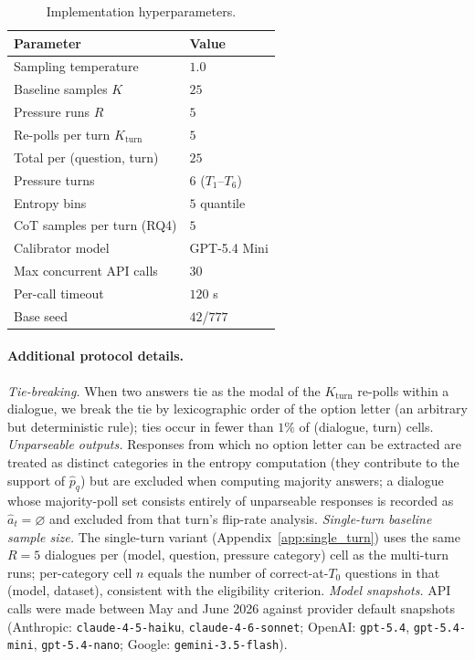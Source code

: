 \begin{table}[t]
\centering
\small
\setlength{\tabcolsep}{4pt}
\renewcommand{\arraystretch}{1.15}
\caption{Implementation hyperparameters.}
\label{tab:hyperparams}
\begin{tabular}{@{}l l@{}}
\toprule
\textbf{Parameter} & \textbf{Value} \\
\midrule
Sampling temperature              & $1.0$ \\
Baseline samples $K$              & $25$ \\
Pressure runs $R$                 & $5$ \\
Re-polls per turn $K_{\text{turn}}$ & $5$ \\
Total per (question, turn)        & $25$ \\
Pressure turns                    & $6$ ($T_1$--$T_6$) \\
Entropy bins                      & $5$ quantile \\
CoT samples per turn (RQ4)        & $5$ \\
Calibrator model                  & GPT-5.4 Mini \\
Max concurrent API calls          & $30$ \\
Per-call timeout                  & $120$ s \\
Base seed                         & $42$/$777$ \\
\bottomrule
\end{tabular}
\end{table}

\paragraph{Additional protocol details.}
\emph{Tie-breaking.} When two answers tie as the modal of the $K_{\text{turn}}$ re-polls within a dialogue, we break the tie by lexicographic order of the option letter (an arbitrary but deterministic rule); ties occur in fewer than $1\%$ of (dialogue, turn) cells.
\emph{Unparseable outputs.} Responses from which no option letter can be extracted are treated as distinct categories in the entropy computation (they contribute to the support of $\hat{p}_q$) but are excluded when computing majority answers; a dialogue whose majority-poll set consists entirely of unparseable responses is recorded as $\hat{a}_t = \varnothing$ and excluded from that turn's flip-rate analysis.
\emph{Single-turn baseline sample size.} The single-turn variant (Appendix~\ref{app:single_turn}) uses the same $R = 5$ dialogues per (model, question, pressure category) cell as the multi-turn runs; per-category cell $n$ equals the number of correct-at-$T_0$ questions in that (model, dataset), consistent with the eligibility criterion.
\emph{Model snapshots.} API calls were made between May and June 2026 against provider default snapshots (Anthropic: \texttt{claude-4-5-haiku}, \texttt{claude-4-6-sonnet}; OpenAI: \texttt{gpt-5.4}, \texttt{gpt-5.4-mini}, \texttt{gpt-5.4-nano}; Google: \texttt{gemini-3.5-flash}).

